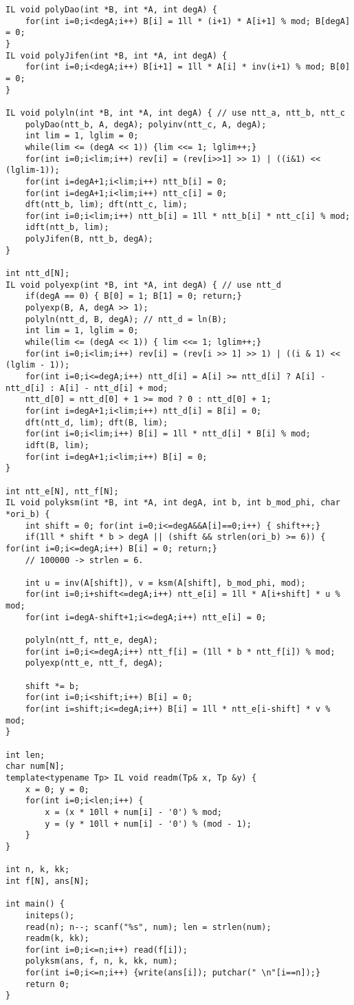 \documentclass[UTF8]{ctexart}
\begin{document}
\begin{framed}
\begin{lstlisting}
IL void polyDao(int *B, int *A, int degA) {
    for(int i=0;i<degA;i++) B[i] = 1ll * (i+1) * A[i+1] % mod; B[degA] = 0;
}
IL void polyJifen(int *B, int *A, int degA) {
    for(int i=0;i<degA;i++) B[i+1] = 1ll * A[i] * inv(i+1) % mod; B[0] = 0;
}

IL void polyln(int *B, int *A, int degA) { // use ntt_a, ntt_b, ntt_c
    polyDao(ntt_b, A, degA); polyinv(ntt_c, A, degA);
    int lim = 1, lglim = 0;
    while(lim <= (degA << 1)) {lim <<= 1; lglim++;}
    for(int i=0;i<lim;i++) rev[i] = (rev[i>>1] >> 1) | ((i&1) << (lglim-1));
    for(int i=degA+1;i<lim;i++) ntt_b[i] = 0;
    for(int i=degA+1;i<lim;i++) ntt_c[i] = 0;
    dft(ntt_b, lim); dft(ntt_c, lim);
    for(int i=0;i<lim;i++) ntt_b[i] = 1ll * ntt_b[i] * ntt_c[i] % mod;
    idft(ntt_b, lim);
    polyJifen(B, ntt_b, degA);
}

int ntt_d[N];
IL void polyexp(int *B, int *A, int degA) { // use ntt_d
    if(degA == 0) { B[0] = 1; B[1] = 0; return;}
    polyexp(B, A, degA >> 1);
    polyln(ntt_d, B, degA); // ntt_d = ln(B);
    int lim = 1, lglim = 0;
    while(lim <= (degA << 1)) { lim <<= 1; lglim++;}
    for(int i=0;i<lim;i++) rev[i] = (rev[i >> 1] >> 1) | ((i & 1) << (lglim - 1));
    for(int i=0;i<=degA;i++) ntt_d[i] = A[i] >= ntt_d[i] ? A[i] - ntt_d[i] : A[i] - ntt_d[i] + mod;
    ntt_d[0] = ntt_d[0] + 1 >= mod ? 0 : ntt_d[0] + 1;
    for(int i=degA+1;i<lim;i++) ntt_d[i] = B[i] = 0;
    dft(ntt_d, lim); dft(B, lim);
    for(int i=0;i<lim;i++) B[i] = 1ll * ntt_d[i] * B[i] % mod;
    idft(B, lim);
    for(int i=degA+1;i<lim;i++) B[i] = 0;
}

int ntt_e[N], ntt_f[N];
IL void polyksm(int *B, int *A, int degA, int b, int b_mod_phi, char *ori_b) {
    int shift = 0; for(int i=0;i<=degA&&A[i]==0;i++) { shift++;}
    if(1ll * shift * b > degA || (shift && strlen(ori_b) >= 6)) { for(int i=0;i<=degA;i++) B[i] = 0; return;}
    // 100000 -> strlen = 6.

    int u = inv(A[shift]), v = ksm(A[shift], b_mod_phi, mod);
    for(int i=0;i+shift<=degA;i++) ntt_e[i] = 1ll * A[i+shift] * u % mod;
    for(int i=degA-shift+1;i<=degA;i++) ntt_e[i] = 0;

    polyln(ntt_f, ntt_e, degA);
    for(int i=0;i<=degA;i++) ntt_f[i] = (1ll * b * ntt_f[i]) % mod;
    polyexp(ntt_e, ntt_f, degA);

    shift *= b;
    for(int i=0;i<shift;i++) B[i] = 0;
    for(int i=shift;i<=degA;i++) B[i] = 1ll * ntt_e[i-shift] * v % mod;
}

int len;
char num[N];
template<typename Tp> IL void readm(Tp& x, Tp &y) {
    x = 0; y = 0;
    for(int i=0;i<len;i++) {
        x = (x * 10ll + num[i] - '0') % mod;
        y = (y * 10ll + num[i] - '0') % (mod - 1);
    }
}

int n, k, kk;
int f[N], ans[N];

int main() {
    initeps();
    read(n); n--; scanf("%s", num); len = strlen(num);
    readm(k, kk);
    for(int i=0;i<=n;i++) read(f[i]);
    polyksm(ans, f, n, k, kk, num);
    for(int i=0;i<=n;i++) {write(ans[i]); putchar(" \n"[i==n]);}
    return 0;
}
\end{lstlisting}
\end{framed}
\end{document}
